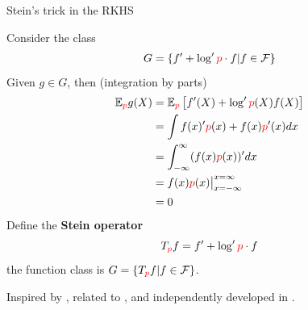 \begin{frame}
\begin{columns}
\begin{column}{.33\linewidth}
\begin{block}{Stein's trick in the RKHS}

Consider the  class \large
$$G = \{ f'  +  \log' { \color{red} p} \cdot  f | f \in \mathcal{F} \}$$
\normalsize
Given $g\in G$, then (integration by parts)
\begin{align*}
\mathbb{E}_{\color{red} p} g(X) &=
\mathbb{E}_{\color{red} p} \left[ f'(X)  +  \log' {\color{red} p}(X) f(X) \right] \\
&= \int   f(x)' { \color{red} p}(x)   + f(x){\color{red} p}'(x) dx \\
&= \int_{-\infty}^{\infty} (f(x) {\color{red} p}(x) )'  dx \\
&= f(x) {\color{red} p}(x)  \big|_{x=-\infty}^{x=\infty} \\
&= 0
\end{align*}
Define the {\bf Stein operator}
\[
 T_{\color{red} p}f =  f'  +  \log' { \color{red} p} \cdot  f
\]
the function class is $G = \{ T_{\color{red} p}f | f \in \mathcal{F} \}$.

Inspired by \cite{gorham2015measuring}, related to \cite{OatGirCho15}, and independently developed in \cite{LiuLeeJor16}.
\end{block} %
\vspace{-0.75cm}



\end{column}
\end{columns}
\end{frame}
